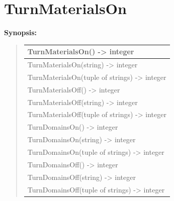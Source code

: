 \documentclass[letterpaper,10pt,english]{sphinxmanual}
\begin{document}
\section{TurnMaterialsOn}
\label{functions:turnmaterialson}
\begin{DUlineblock}{0em}
\item[] \textbf{Synopsis:}
\end{DUlineblock}
\begin{quote}

\begin{tabulary}{\linewidth}{|L|}
\hline

TurnMaterialsOn() -\textgreater{} integer
\\
\hline
TurnMaterialsOn(string) -\textgreater{} integer
\\
\hline
TurnMaterialsOn(tuple of strings) -\textgreater{} integer
\\
\hline
TurnMaterialsOff() -\textgreater{} integer
\\
\hline
TurnMaterialsOff(string) -\textgreater{} integer
\\
\hline
TurnMaterialsOff(tuple of strings) -\textgreater{} integer
\\
\hline
TurnDomainsOn() -\textgreater{} integer
\\
\hline
TurnDomainsOn(string) -\textgreater{} integer
\\
\hline
TurnDomainsOn(tuple of strings) -\textgreater{} integer
\\
\hline
TurnDomainsOff() -\textgreater{} integer
\\
\hline
TurnDomainsOff(string) -\textgreater{} integer
\\
\hline
TurnDomainsOff(tuple of strings) -\textgreater{} integer
\\
\hline\end{tabulary}

\end{quote}
\end{document}
